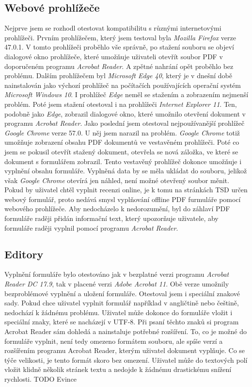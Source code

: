 \documentclass[czech,BP]{thesiskiv}
\begin{document}
\subsection{Webové prohlížeče}
Nejprve jsem se rozhodl otestovat kompatibilitu s různými internetovými prohlížeči. Prvním prohlížečem, který jsem testoval byla \emph{Mozilla Firefox} verze 47.0.1. V tomto prohlížeči proběhlo vše správně, po stažení souboru se objeví dialogové okno prohlížeče, které umožňuje uživateli otevřít soubor PDF v doporučeném programu \emph{Acrobat Reader}. A zpětné nahrání opět proběhlo bez problému. Dalším prohlížečem byl \emph{Microsoft Edge 40}, který je v dnešní době nainstalován jako výchozí prohlížeč na počítačích používajících operační systém \emph{Microsoft Windows 10}. I prohlížeč \emph{Edge} neměl se stažením a zobrazením nejmenší problém. Poté jsem stažení otestoval i na prohlížeči \emph{Internet Explorer 11}. Ten, podobně jako \emph{Edge}, zobrazil dialogové okno, které umožnilo otevření dokument v programu \emph{Acrobat Reader}. Jako poslední jsem otestoval nejpoužívanější prohlížeč \emph{Google Chrome} verze 57.0. U něj jsem narazil na problém. \emph{Google Chrome} totiž umožňuje zobrazení obsahu PDF dokumentů ve vestavěném prohlížeči. Poté co jsem se pokusil otevřít stažený dokument, otevřela se nová záložka, ve které se dokument s formulářem zobrazil. Tento vestavěný prohlížeč dokonce umožňuje i vyplnění obsahu formuláře. Vyplněná data by se měla ukládat do souboru, jelikož však \emph{Google Chrome} otevírá jen náhled, není možné otevřený soubor měnit. Pokud by uživatel chtěl vyplnit recenzi online, je k tomu na stránkách TSD určen webový formulář, proto nedává smysl vyplňování offline PDF furmuláře pomocí webového prohlížeče. Aby nedocházelo k nedorozumění, byl do záhlaví PDF formuláře raději přidán informační text, který upozorňuje uživatele, aby formuláře raději vyplnil pomocí programu \emph{Acrobat Reader}.
\subsection{Editory}
Vyplnění formuláře bylo otestováno jak v bezplatné verzi programu \emph{Acrobat Reader DC 17.9}, tak v placené verzi \emph{Adobe Acrobat 11}. Obě verze umožnily bezproblémové vyplnění a uložení formuláře. Otestoval jsem i speciální znakové sady. Pokud chce uživatel vyplnit formulář například v angličtině nebo češtině, nedochází k žádnému problému. Uživatel může dokonce do formuláře vložit i speciální znaky, které se nacházejí v UTF-8. Při psaní těchto znaků si program Acrobat Reader sám dohledá a nainstaluje potřebné rozšíření. To, co je možné do formuláře vyplnit, není tedy omezeno formátem souboru, ale spíše verzí a rozšířením programu Acrobat Reader, kterým uživatel dokument vyplňuje. Co se týče velikosti, je tento formát skoro bez omezení. Uživatel může do textových polí vložit klidně několik stránek textu a nedojde k žádnému drastickému snížení rychlosti. 
TODO Evince
\end{document}
